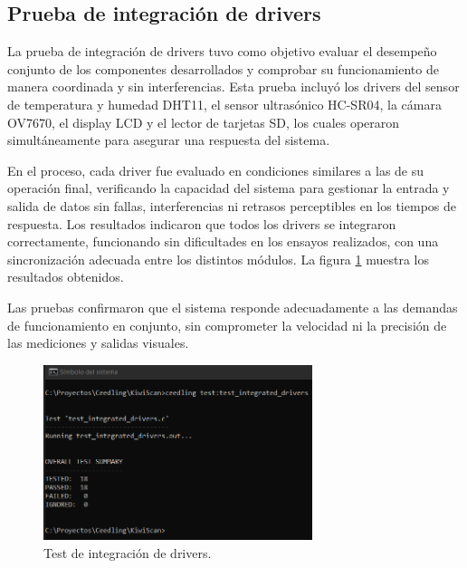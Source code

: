 \vspace{1cm}

\subsection{Prueba de integración de drivers}

La prueba de integración de drivers tuvo como objetivo evaluar el desempeño conjunto de los componentes desarrollados y comprobar su funcionamiento de manera coordinada y sin interferencias. Esta prueba incluyó los drivers del sensor de temperatura y humedad DHT11, el sensor ultrasónico HC-SR04, la cámara OV7670, el display LCD y el lector de tarjetas SD, los cuales operaron simultáneamente para asegurar una respuesta del sistema.

En el proceso, cada driver fue evaluado en condiciones similares a las de su operación final, verificando la capacidad del sistema para gestionar la entrada y salida de datos sin fallas, interferencias ni retrasos perceptibles en los tiempos de respuesta. Los resultados indicaron que todos los drivers se integraron correctamente, funcionando sin dificultades en los ensayos realizados, con una sincronización adecuada entre los distintos módulos. La figura \ref{fig:test_integrated_drivers} muestra los resultados obtenidos.

Las pruebas confirmaron que el sistema responde adecuadamente a las demandas de funcionamiento en conjunto, sin comprometer la velocidad ni la precisión de las mediciones y salidas visuales.

\newpage

\vspace{1cm}

\begin{figure}[htbp]
	\centering
	\includegraphics[width=0.7\textwidth, height=0.3\textheight]{./Figures/test_integrated_drivers.png}
	\caption{Test de integración de drivers.}
	\label{fig:test_integrated_drivers}
\end{figure}

